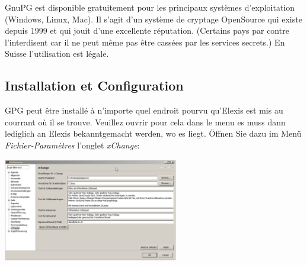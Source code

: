  GnuPG est disponible gratuitement pour les principaux systèmes d'exploitation (Windows, Linux, Mac). Il s'agit d'un système de cryptage OpenSource qui existe depuis 1999 et qui jouit d'une excellente réputation. (Certains pays par contre l'interdisent car il ne peut même pas être cassées par les services secrets.) En Suisse l'utilisation est légale.
\subsection{Installation et  Configuration}

GPG peut être installé à n'importe quel endroit pourvu qu'Elexis est mis au courrant où il se trouve. Veuillez ouvrir pour cela dans le menu es muss dann lediglich an Elexis bekanntgemacht werden, wo es liegt. Öffnen Sie dazu im Menü \textit{Fichier-Paramètres} l'onglet \textit{xChange}:

\includegraphics[width=3in]{images/xc1.png}

